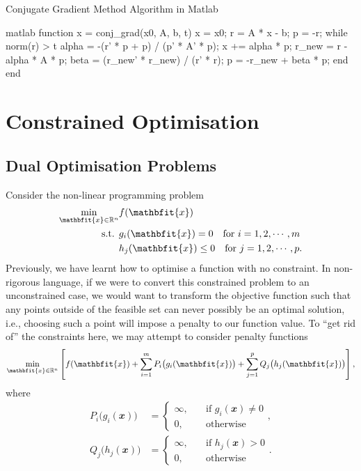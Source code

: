\documentclass[math, code]{amznotes}
\theoremstyle{remark}
\begin{document}
\begin{codebox}{Conjugate Gradient Method Algorithm in Matlab}{}
    \begin{amzcode}{matlab}
function x = conj_grad(x0, A, b, t)
    x = x0;
    r = A * x - b;
    p = -r;
    while norm(r) > t
        alpha = -(r' * p + p) / (p' * A' * p);
        x += alpha * p;
        r_new = r - alpha * A * p;
        beta = (r_new' * r_new) / (r' * r);
        p = -r_new + beta * p;
    end
end
    \end{amzcode}
\end{codebox}
\chapter{Constrained Optimisation}
\section{Dual Optimisation Problems}
Consider the non-linear programming problem
\begin{align*}
    \min_{\mathbfit{x} \in \R^n} & f(\mathbfit{x}) \\
    \textrm{s.t. } & g_i(\mathbfit{x}) = 0 \quad\textrm{for } i = 1, 2, \cdots, m \\
    & h_j(\mathbfit{x}) \leq 0 \quad\textrm{for } j = 1, 2, \cdots, p.
\end{align*}
Previously, we have learnt how to optimise a function with no constraint. In non-rigorous language, if we were to convert this constrained problem to an unconstrained case, we would want to transform the objective function such that any points outside of the feasible set can never possibly be an optimal solution, i.e., choosing such a point will impose a penalty to our function value. To ``get rid of'' the constraints here, we may attempt to consider penalty functions
\begin{equation*}
    \min_{\mathbfit{x} \in \R^n} \left[f(\mathbfit{x}) + \sum_{i = 1}^{m}P_i\bigl(g_i(\mathbfit{x})\bigr) + \sum_{j = 1}^{p}Q_j\bigl(h_j(\mathbfit{x})\bigr)\right],
\end{equation*}
where 
\begin{align*}
    P_i\bigl(g_i(\mathbfit{x})\bigr) & = \begin{cases}
        \infty, & \quad\textrm{if } g_i(\mathbfit{x}) \neq 0 \\
        0, & \quad\textrm{otherwise}
    \end{cases}, \\
    Q_j\bigl(h_j(\mathbfit{x})\bigr) & = \begin{cases}
        \infty, & \quad\textrm{if } h_j(\mathbfit{x}) > 0 \\
        0, & \quad\textrm{otherwise}
    \end{cases}.
\end{align*}
\end{document}
